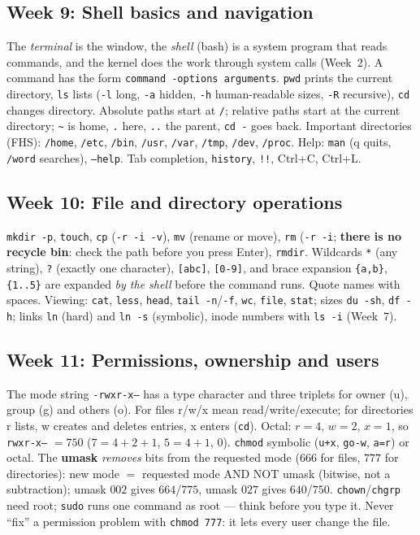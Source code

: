 \documentclass[11pt,a4paper]{article}
\newcommand{\term}[1]{\textbf{\color{mintdeep}#1}}
\newcommand{\cmd}[1]{\texttt{#1}}
\begin{document}
\subsection{Week 9: Shell basics and navigation}
The \emph{terminal} is the window, the \emph{shell} (bash) is a system program that reads commands, and the kernel does the work through system calls (Week~2). A command has the form \texttt{command -options arguments}. \cmd{pwd} prints the current directory, \cmd{ls} lists (\cmd{-l} long, \cmd{-a} hidden, \cmd{-h} human-readable sizes, \cmd{-R} recursive), \cmd{cd} changes directory. Absolute paths start at \texttt{/}; relative paths start at the current directory; \texttt{\textasciitilde} is home, \texttt{.} here, \texttt{..} the parent, \cmd{cd -} goes back. Important directories (FHS): \texttt{/home}, \texttt{/etc}, \texttt{/bin}, \texttt{/usr}, \texttt{/var}, \texttt{/tmp}, \texttt{/dev}, \texttt{/proc}. Help: \cmd{man} (q quits, \texttt{/word} searches), \cmd{--help}. Tab completion, \cmd{history}, \cmd{!!}, Ctrl+C, Ctrl+L.


\subsection{Week 10: File and directory operations}
\cmd{mkdir -p}, \cmd{touch}, \cmd{cp} (\cmd{-r -i -v}), \cmd{mv} (rename or move), \cmd{rm} (\cmd{-r -i}; \textbf{there is no recycle bin}: check the path before you press Enter), \cmd{rmdir}. Wildcards \texttt{*} (any string), \texttt{?} (exactly one character), \texttt{[abc]}, \texttt{[0-9]}, and brace expansion \texttt{\{a,b\}}, \texttt{\{1..5\}} are expanded \emph{by the shell} before the command runs. Quote names with spaces. Viewing: \cmd{cat}, \cmd{less}, \cmd{head}, \cmd{tail -n}/\cmd{-f}, \cmd{wc}, \cmd{file}, \cmd{stat}; sizes \cmd{du -sh}, \cmd{df -h}; links \cmd{ln} (hard) and \cmd{ln -s} (symbolic), inode numbers with \cmd{ls -i} (Week~7).


\subsection{Week 11: Permissions, ownership and users}
The mode string \texttt{-rwxr-x---} has a type character and three triplets for owner (u), group (g) and others (o). For files r/w/x mean read/write/execute; for directories r lists, w creates and deletes entries, x enters (\cmd{cd}). Octal: $r = 4$, $w = 2$, $x = 1$, so \texttt{rwxr-x---} $= 750$ ($7 = 4+2+1$, $5 = 4+1$, $0$). \cmd{chmod} symbolic (\cmd{u+x}, \cmd{go-w}, \cmd{a=r}) or octal. The \term{umask} \emph{removes} bits from the requested mode ($666$ for files, $777$ for directories): new mode $=$ requested mode AND NOT umask (bitwise, not a subtraction); umask $002$ gives $664$/$775$, umask $027$ gives $640$/$750$. \cmd{chown}/\cmd{chgrp} need root; \cmd{sudo} runs one command as root --- think before you type it. Never ``fix'' a permission problem with \cmd{chmod 777}: it lets every user change the file.

\end{document}
